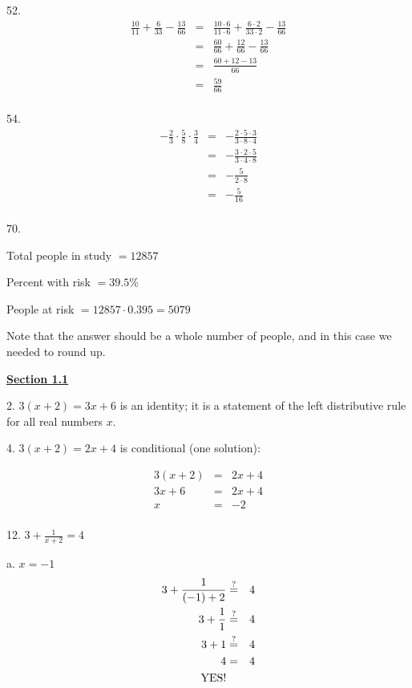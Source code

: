 \documentclass[letterpaper]{article}
\begin{document}
\bigskip

52.
\begin{eqnarray*}
\frac{10}{11}+\frac{6}{33}-\frac{13}{66} &=&
    \frac{10\cdot6}{11\cdot6}+\frac{6\cdot2}{33\cdot2}-\frac{13}{66} \\
&=& \frac{60}{66}+\frac{12}{66}-\frac{13}{66} \\
&=& \frac{60+12-13}{66} \\
&=& \frac{59}{66} \\
\end{eqnarray*}

54.
\begin{eqnarray*}
-\frac{2}{3}\cdot\frac{5}{8}\cdot\frac{3}{4} &=&
    -\frac{2\cdot5\cdot3}{3\cdot8\cdot4} \\
&=& -\frac{3\cdot2\cdot5}{3\cdot4\cdot8} \\
&=& -\frac{5}{2\cdot8} \\
&=& -\frac{5}{16} \\
\end{eqnarray*}

70.

\bigskip

Total people in study $=12857$

Percent with risk $=39.5\%$

People at risk $=12857\cdot0.395=5079$

Note that the answer should be a whole number of people, and in this case we
needed to round up.

\bigskip

\underline{\textbf{Section 1.1}}

\bigskip

2. $3(x+2)=3x+6$ is an identity; it is a statement of the left distributive
rule for all real numbers $x$.

\bigskip

4. $3(x+2)=2x+4$ is conditional (one solution):

\begin{eqnarray*}
3(x+2) &=& 2x+4 \\
3x+6 &=& 2x+4 \\
x &=& -2 \\
\end{eqnarray*}

\bigskip

12. $3+\frac{1}{x+2}=4$

\bigskip

a. $x=-1$
\begin{eqnarray*}
3+\frac{1}{(-1)+2} &\stackrel{?}{=}& 4 \\
3+\frac{1}{1} &\stackrel{?}{=}& 4 \\
3+1 &\stackrel{?}{=}& 4 \\
4 &=& 4 \\
\mbox{YES!} \\
\end{eqnarray*}
\end{document}
